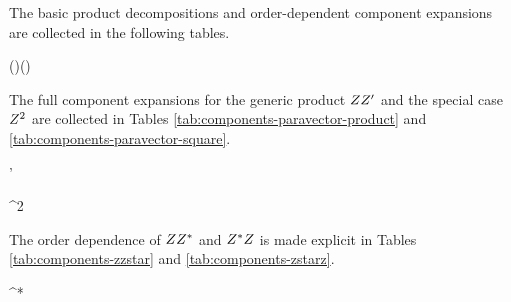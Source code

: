 \noindent The basic product decompositions and order-dependent component
expansions are collected in the following tables.
\begin{componenttable}{(\cdot\sigv)(\cdot\sigv)}
\end{componenttable}

\begin{componenttable}{ }
\end{componenttable}

\noindent The full component expansions for the generic product
\(ZZ'\) and the special case \(Z^2\) are collected in
Tables \ref{tab:components-paravector-product} and
\ref{tab:components-paravector-square}.
\begin{componenttable}{ '}
\end{componenttable}

\begin{componenttable}{^{2}}
\end{componenttable}

\noindent The order dependence of \(ZZ^{*}\) and
\(Z^{*}Z\) is made explicit in Tables
\ref{tab:components-zzstar} and \ref{tab:components-zstarz}.
\begin{componenttable}{ ^{*}}
\end{componenttable}

